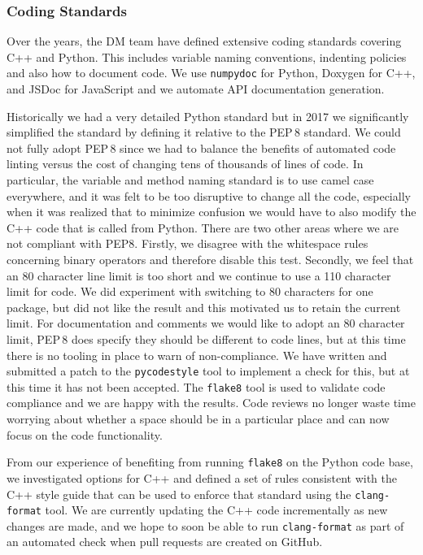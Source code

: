 \subsubsection{Coding Standards}
\label{sec:coding-standards}

Over the years, the DM team have defined extensive coding standards\cite{devguide} covering C++ and Python.
This includes variable naming conventions, indenting policies and also how to document code.
We use \texttt{numpydoc}\cite{numpydoc} for Python, Doxygen\cite{doxygen} for C++, and JSDoc\cite{jsdoc} for JavaScript and we automate API documentation generation.

Historically we had a very detailed Python standard but in 2017 we significantly simplified the standard by defining it relative to the PEP\,8 standard\cite{pep8}.
We could not fully adopt PEP\,8 since we had to balance the benefits of automated code linting versus the cost of changing tens of thousands of lines of code.
In particular, the variable and method naming standard is to use camel case everywhere, and it was felt to be too disruptive to change all the code, especially when it was realized that to minimize confusion we would have to also modify the C++ code that is called from Python.
There are two other areas where we are not compliant with PEP8.
Firstly, we disagree with the whitespace rules concerning binary operators and therefore disable this test.
Secondly, we feel that an 80 character line limit is too short and we continue to use a 110 character limit for code.
We did experiment with switching to 80 characters for one package, but did not like the result and this motivated us to retain the current limit.
For documentation and comments we would like to adopt an 80 character limit, PEP\,8 does specify they should be different to code lines, but at this time there is no tooling in place to warn of non-compliance.
We have written and submitted a patch to the \texttt{pycodestyle} tool to implement a check for this, but at this time it has not been accepted.
The \texttt{flake8} tool is used to validate code compliance and we are happy with the results.
Code reviews no longer waste time worrying about whether a space should be in a particular place and can now focus on the code functionality.

From our experience of benefiting from running \texttt{flake8} on the Python code base, we investigated options for C++ and defined a set of rules consistent with the C++ style guide that can be used to enforce that standard using the \texttt{clang-format}\cite{clangformat} tool.
We are currently updating the C++ code incrementally as new changes are made, and we hope to soon be able to run \texttt{clang-format} as part of an automated check when pull requests are created on GitHub.

